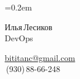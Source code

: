 \documentclass[11pt, a4paper]{article}
\newcommand\Eng[1]{%
  \foreignlanguage{english}{#1}%
}
\begin{document}
\sffamily

\font=0.2em

\raggedright

\newlength{\DelimitlineLength}
\setlength{\DelimitlineLength}{\textwidth+1em}

\pagecolor[RGB]{245,245,245}

{\setlength\multicolsep{0pt}%
\begin{multicols}{2}

\begin{spacing}{1.5}
  {\LARGE Илья\,Лесиков}\\
  {\Large\Eng{DevOps}}\hspace{1cm}{\large 25\,лет}
\end{spacing}

\columnbreak

\begin{flushright}
  \begin{spacing}{1.3}
    {\large\href{mailto:bititanc@gmail.com}{\Eng{bititanc@gmail.com}}}\\
    {\fontsize{1.4em}{0}\,(930)\,88-66-248} \normalsize\\
  \end{spacing}
\end{flushright}

\end{multicols}
}


\vspace{3ex}

\begin{comment}
У меня нет образования (неоконченный колледж электроники) и сомнительный стаж (10 месяцев сисадмином).\\
Но, самообучаясь, за последние пару лет я получил достаточный опыт и в общей автоматизации, и в \Eng{CI/CD}.\\
Получил некоторый опыт и в кодинге, как и хороший общий технический бэкграунд (\Eng{Linux}, сети и т.\,п.).
\end{comment}

\end{document}
